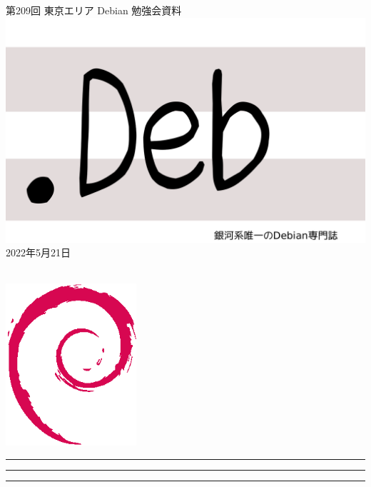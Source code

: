 \documentclass[mingoth,a4paper]{jsarticle}
\newcommand{\debmtgyear}{2022}
\newcommand{\debmtgmonth}{5}
\newcommand{\debmtgdate}{21}
\newcommand{\debmtgnumber}{209}
\begin{document}
\begin{titlepage}
\thispagestyle{empty}

\vspace*{-2cm}
第\debmtgnumber{}回 東京エリア Debian 勉強会資料\\
\hspace*{-2cm}
\includegraphics{image-assets/dotdeb.pdf}\\
\hfill{}\debmtgyear{}年\debmtgmonth{}月\debmtgdate{}日

\\

\vspace*{-2cm}
\hfill{}\includegraphics[height=6cm]{image-assets/openlogo-nd.eps}
\end{titlepage}

\newpage

\begin{minipage}[b]{0.2\hsize}
 \colorbox{titleback}{}
\end{minipage}
\begin{minipage}[b]{0.8\hsize}
\hrule
\vspace{2mm}
\hrule
\begin{multicols}{2}
\tableofcontents
\end{multicols}
\vspace{2mm}
\hrule
\end{minipage}
\end{document}
